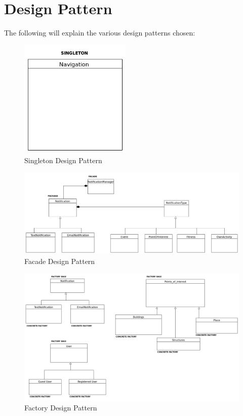 \documentclass{article}
\begin{document}
\section{Design Pattern}
The following will explain the various design patterns chosen:
	\FloatBarrier	
	\begin{figure}[h]
		\centering
		\caption{Singleton Design Pattern}
  		\includegraphics[width=200px]{Images/Singleton.png}
	\end{figure}
	\begin{figure}
		\caption{Facade Design Pattern}
  		\includegraphics[width=\textwidth]{Images/Facade.png}
	\end{figure}
	\begin{figure}
		\caption{Factory Design Pattern}
  		\includegraphics[width=\textwidth]{Images/Factory.png}
	\end{figure}
\end{document}
